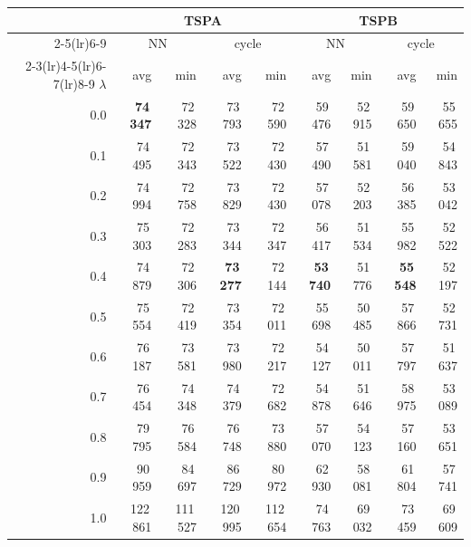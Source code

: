 \begin{tabular}{rrrrrrrrr}
\toprule
 & \multicolumn{4}{c}{TSPA} & \multicolumn{4}{c}{TSPB} \\
\cmidrule(lr){2-5}\cmidrule(lr){6-9}
 & \multicolumn{2}{c}{NN} & \multicolumn{2}{c}{cycle} & \multicolumn{2}{c}{NN} & \multicolumn{2}{c}{cycle} \\
\cmidrule(lr){2-3}\cmidrule(lr){4-5}\cmidrule(lr){6-7}\cmidrule(lr){8-9}
$\lambda$ & avg & min & avg & min & avg & min & avg & min \\
\midrule
0.0 & \textbf{74\,347} & 72\,328 & 73\,793 & 72\,590 & 59\,476 & 52\,915 & 59\,650 & 55\,655 \\
0.1 & 74\,495 & 72\,343 & 73\,522 & 72\,430 & 57\,490 & 51\,581 & 59\,040 & 54\,843 \\
0.2 & 74\,994 & 72\,758 & 73\,829 & 72\,430 & 57\,078 & 52\,203 & 56\,385 & 53\,042 \\
0.3 & 75\,303 & 72\,283 & 73\,344 & 72\,347 & 56\,417 & 51\,534 & 55\,982 & 52\,522 \\
0.4 & 74\,879 & 72\,306 & \textbf{73\,277} & 72\,144 & \textbf{53\,740} & 51\,776 & \textbf{55\,548} & 52\,197 \\
0.5 & 75\,554 & 72\,419 & 73\,354 & 72\,011 & 55\,698 & 50\,485 & 57\,866 & 52\,731 \\
0.6 & 76\,187 & 73\,581 & 73\,980 & 72\,217 & 54\,127 & 50\,011 & 57\,797 & 51\,637 \\
0.7 & 76\,454 & 74\,348 & 74\,379 & 72\,682 & 54\,878 & 51\,646 & 58\,975 & 53\,089 \\
0.8 & 79\,795 & 76\,584 & 76\,748 & 73\,880 & 57\,070 & 54\,123 & 57\,160 & 53\,651 \\
0.9 & 90\,959 & 84\,697 & 86\,729 & 80\,972 & 62\,930 & 58\,081 & 61\,804 & 57\,741 \\
1.0 & 122\,861 & 111\,527 & 120\,995 & 112\,654 & 74\,763 & 69\,032 & 73\,459 & 69\,609 \\
\bottomrule
\end{tabular}
